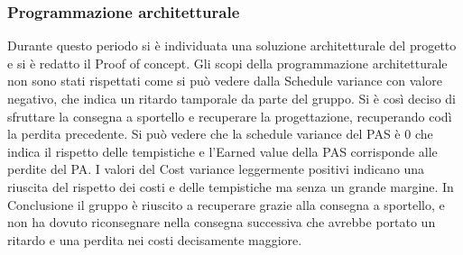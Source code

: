 \subsubsection{Programmazione architetturale}
Durante questo periodo si è individuata una soluzione architetturale del progetto e si è redatto il Proof of concept.
Gli scopi della programmazione architetturale non sono stati rispettati come si può vedere dalla Schedule variance con valore negativo, che indica un ritardo tamporale da parte del gruppo.
Si è così deciso di sfruttare la consegna a sportello e recuperare la progettazione, recuperando codì la perdita precedente. Si può vedere che la schedule variance del PAS è 0 che indica il rispetto delle tempistiche e l'Earned value della PAS corrisponde alle perdite del PA.
I valori del Cost variance leggermente positivi indicano una riuscita del rispetto dei costi e delle tempistiche ma senza un grande margine.
In Conclusione il gruppo è riuscito a recuperare grazie alla consegna a sportello, e non ha dovuto riconsegnare nella consegna successiva che avrebbe portato un ritardo e una perdita nei costi decisamente maggiore.